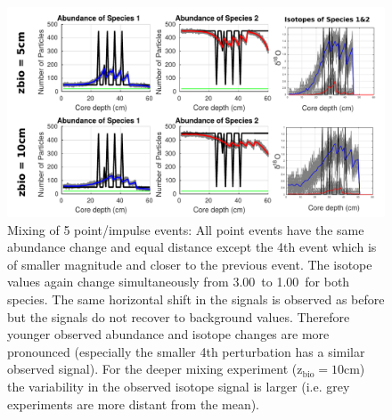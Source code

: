 \documentclass[a4paper,oneside,9pt]{article}
\begin{document}
\begin{figure}[hbp]
\begin{center}
	\includegraphics[width=1.0\textwidth]{../figures/../figures/5point_event_5+10cm_background.pdf}
	\caption{Mixing of 5 point/impulse events: All point events have the same abundance change and equal distance except the 4th event which is of smaller magnitude and closer to the previous event. 
	The isotope values again change simultaneously from 3.00\textperthousand\ to 1.00\textperthousand\ for both species. The same horizontal shift in the signals is observed as before but the signals do not recover to background values. 
	Therefore younger observed abundance and isotope changes are more pronounced (especially the smaller 4th perturbation has a similar observed signal).
	For the deeper mixing experiment (z$_\mathrm{bio}=10$cm) the variability in the observed isotope signal is larger (i.e. grey experiments are more distant from the mean).
}\label{fig:5pointevent}
\end{center}
\end{figure}
\end{document}
